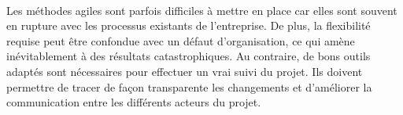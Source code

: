 \paragraph{}
Les méthodes agiles sont parfois difficiles à mettre en place car elles sont souvent en rupture avec les processus existants de l'entreprise.
De plus, la flexibilité requise peut être confondue avec un défaut d'organisation, ce qui amène inévitablement à des résultats catastrophiques.
Au contraire, de bons outils adaptés sont nécessaires pour effectuer un vrai suivi du projet.
Ils doivent permettre de tracer de façon transparente les changements et d'améliorer la communication entre les différents acteurs du projet.

